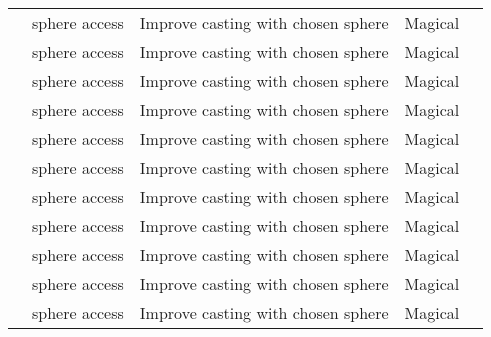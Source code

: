 \begin{longtabuwrapper}
\begin{longtabu}{>{\lcol}p{11em} >{\lcol}p{15em} >{\lcol}X >{\lcol}p{8em} >{\lcol}p{3em}}
               &  sphere access       & Improve casting with chosen sphere & Magical &        \\
           &  sphere access   & Improve casting with chosen sphere & Magical &    \\
            &  sphere access    & Improve casting with chosen sphere & Magical &     \\
             &  sphere access     & Improve casting with chosen sphere & Magical &      \\
         &  sphere access & Improve casting with chosen sphere & Magical &  \\
          &  sphere access  & Improve casting with chosen sphere & Magical &   \\
               &  sphere access       & Improve casting with chosen sphere & Magical &        \\
           &  sphere access   & Improve casting with chosen sphere & Magical &    \\
            &  sphere access    & Improve casting with chosen sphere & Magical &     \\
            &  sphere access    & Improve casting with chosen sphere & Magical &     \\
           &  sphere access   & Improve casting with chosen sphere & Magical &    \\

\end{longtabu}
\end{longtabuwrapper}

